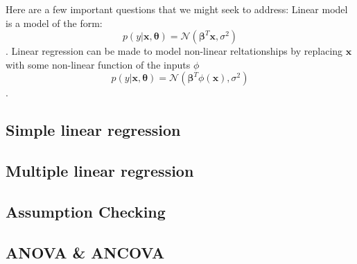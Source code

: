 Here are a few important questions that we might seek to address:
Linear model is a model of the form:
$$ p(y|\bm{x}, \bm{\theta}) = \mathcal{N}\left(
\bm{\beta}^{T}\bm{x},\sigma^{2}\right)$$.
Linear regression can be made to model non-linear reltationships by replacing
$\bm{x}$ with some non-linear function of the inputs $\phi$
$$ p(y|\bm{x}, \bm{\theta}) = \mathcal{N}\left(
\bm{\beta}^{T}\phi(\bm{x}),\sigma^{2}\right)$$.
\subsection{Simple linear regression}

\subsection{Multiple linear regression}

\subsection{Assumption Checking}

\subsection{ANOVA \& ANCOVA}

